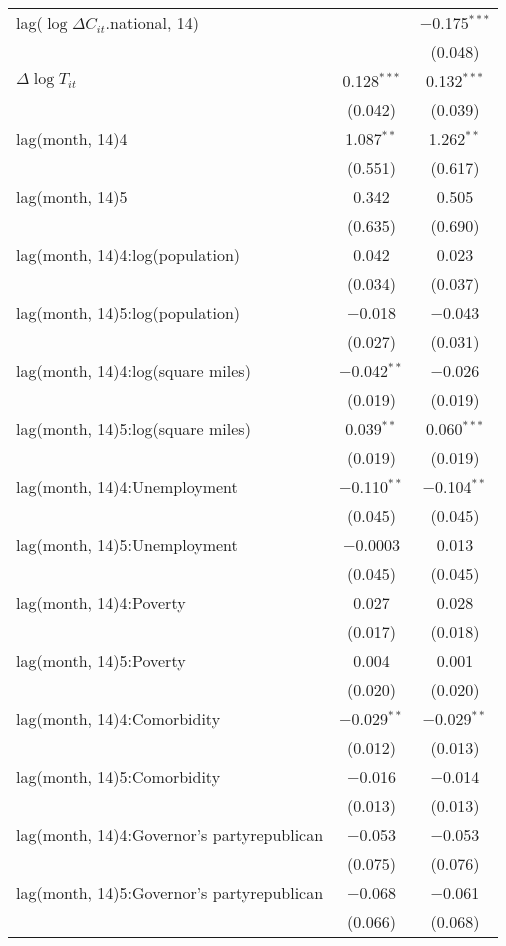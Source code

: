 \begin{tabular}{@{\extracolsep{1pt}}lcc}
  lag($\log \Delta C_{it}$.national, 14) &  & $-$0.175$^{***}$ \\ 
  &  & (0.048) \\ 
  $\Delta \log T_{it}$ & 0.128$^{***}$ & 0.132$^{***}$ \\ 
  & (0.042) & (0.039) \\ 
  lag(month, 14)4 & 1.087$^{**}$ & 1.262$^{**}$ \\ 
  & (0.551) & (0.617) \\ 
  lag(month, 14)5 & 0.342 & 0.505 \\ 
  & (0.635) & (0.690) \\ 
  lag(month, 14)4:log(population) & 0.042 & 0.023 \\ 
  & (0.034) & (0.037) \\ 
  lag(month, 14)5:log(population) & $-$0.018 & $-$0.043 \\ 
  & (0.027) & (0.031) \\ 
  lag(month, 14)4:log(square miles) & $-$0.042$^{**}$ & $-$0.026 \\ 
  & (0.019) & (0.019) \\ 
  lag(month, 14)5:log(square miles) & 0.039$^{**}$ & 0.060$^{***}$ \\ 
  & (0.019) & (0.019) \\ 
  lag(month, 14)4:Unemployment & $-$0.110$^{**}$ & $-$0.104$^{**}$ \\ 
  & (0.045) & (0.045) \\ 
  lag(month, 14)5:Unemployment & $-$0.0003 & 0.013 \\ 
  & (0.045) & (0.045) \\ 
  lag(month, 14)4:Poverty & 0.027 & 0.028 \\ 
  & (0.017) & (0.018) \\ 
  lag(month, 14)5:Poverty & 0.004 & 0.001 \\ 
  & (0.020) & (0.020) \\ 
  lag(month, 14)4:Comorbidity & $-$0.029$^{**}$ & $-$0.029$^{**}$ \\ 
  & (0.012) & (0.013) \\ 
  lag(month, 14)5:Comorbidity & $-$0.016 & $-$0.014 \\ 
  & (0.013) & (0.013) \\ 
  lag(month, 14)4:Governor's partyrepublican & $-$0.053 & $-$0.053 \\ 
  & (0.075) & (0.076) \\ 
  lag(month, 14)5:Governor's partyrepublican & $-$0.068 & $-$0.061 \\ 
  & (0.066) & (0.068) \\ 

\end{tabular}
